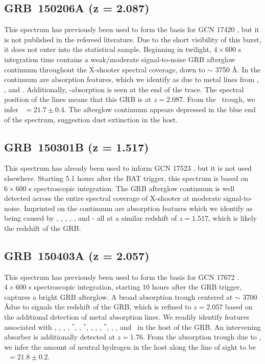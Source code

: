 \documentclass{aa}    %
\begin{document}
\subsection{GRB~150206A (z = 2.087)}\label{150206}

This spectrum has previously been used to form the basis for GCN 17420
\citep{GCN17420}, but it is not published in the refereed literature. Due to the
short visibility of this burst, it does not enter into the statistical sample.
Beginning in twilight, $4\times600$ s integration time contains a weak/moderate
signal-to-noise GRB afterglow continuum throughout the X-shooter spectral
coverage, down to $\sim$ 3750 \AA. In the continuum are absorption features,
which we identify as due to metal lines from \znii, \feii, and \mgii.
Additionally, \lya-absorption is seen at the end of the trace. The spectral
position of the lines means that this GRB is at $z = 2.087$. From the
\lya~trough, we infer \nh~$=21.7 \pm 0.4$. The afterglow continuum appears
depressed in the blue end of the spectrum, suggestion dust extinction in the
host.

\subsection{GRB~150301B (z = 1.517)}\label{150301}

This spectrum has already been used to inform GCN 17523 \citep{GCN17523}, but it
is not used elsewhere. Starting 5.1 hours after the BAT trigger, this spectrum
is based on $6 \times 600$ s spectroscopic integration. The GRB afterglow
continuum is well detected across the entire spectral coverage of X-shooter at
moderate signal-to-noise. Imprinted on the continuum are absorption features
which we identify as being caused by \SIii, \civ, \alii, \feii, \mgii, and \mgi
- all at a similar redshift of $z = 1.517$, which is likely the redshift of the
GRB.

\subsection{GRB~150403A (z = 2.057)}\label{150403}

This spectrum has previously been used to form the basis for GCN 17672
\citep{GCN17672}. $4 \times 600$ s spectroscopic integration, starting 10 hours
after the GRB trigger, captures a bright GRB afterglow. A broad absorption
trough centered at $\sim$ 3700 \AA due to \lya signals the redshift of the GRB,
which is refined to $z = 2.057$ based on the additional detection of metal
absorption lines. We readily identify features associated with \sii, \SIiv, \oi,
\SIii, \SIii$^*$, \cii, \cii$^*$, \civ, \alii, \feii, \feii$^*$, \mni, \mgii,
and \mgi~in the host of the GRB. An intervening \civ absorber is additionally
detected at $z=1.76$. From the absorption trough due to \lya, we infer the
amount of neutral hydrogen in the host along the line of sight to be \nh~$=21.8
\pm 0.2$.
\end{document}
